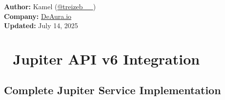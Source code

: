 \documentclass[11pt,a4paper]{article}
\begin{document}
\begin{titlepage}
    \vfill
    
    {\large\textbf{Author:} Kamel (\href{https://x.com/treizeb__}{@treizeb\_\_})\\
    \textbf{Company:} \href{https://deaura.io}{DeAura.io}\\
    \textbf{Updated:} July 14, 2025\par}
\end{titlepage}

\newpage
\tableofcontents
\newpage

\section{🚀 Jupiter API v6 Integration}

\subsection{Complete Jupiter Service Implementation}
\end{document}

